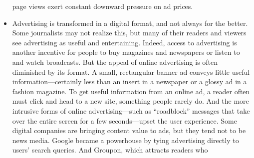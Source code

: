 \begin{itemize}
page views exert constant downward pressure on ad prices.
\item Advertising is transformed in a digital format, and not always for the
better. Some journalists may not realize this, but many of their readers and
viewers see advertising as useful and entertaining. Indeed, access to advertising
is another incentive for people to buy magazines and newspapers or
listen to and watch broadcasts. But the appeal of online advertising is often
diminished by its format. A small, rectangular banner ad conveys little useful
information—certainly less than an insert in a newspaper or a glossy ad
in a fashion magazine. To get useful information from an online ad, a reader
often must click and head to a new site, something people rarely do. And the
more intrusive forms of online advertising—such as ``roadblock'' messages
that take over the entire screen for a few seconds—upset the user experience.
Some digital companies are bringing content value to ads, but they tend
not to be news media. Google became a powerhouse by tying advertising
directly to users' search queries. And Groupon, which attracts readers who


\end{itemize}
